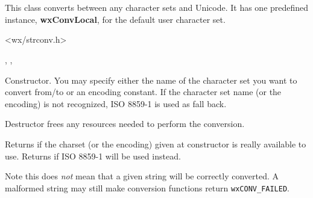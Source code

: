 %
%

\section{}\label{wxcsconv}

This class converts between any character sets and Unicode.
It has one predefined instance, {\bf wxConvLocal}, for the
default user character set.




<wx/strconv.h>




, 
, 


\label{wxcsconvwxcsconv}



Constructor. You may specify either the name of the character set you want to
convert from/to or an encoding constant. If the character set name (or the
encoding) is not recognized, ISO 8859-1 is used as fall back.


\label{wxcsconvdtor}


Destructor frees any resources needed to perform the conversion.


\label{wxcsconvisok}


Returns \true if the charset (or the encoding) given at constructor is really
available to use. Returns \false if ISO 8859-1 will be used instead.

Note this does \emph{not} mean that a given string will be correctly converted.
A malformed string may still make conversion functions return \texttt{wxCONV\_FAILED}.

